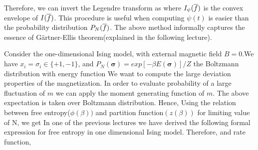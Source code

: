 \documentclass[letterpaper,english,10pt]{article}
\begin{document}
Therefore, we can invert the Legendre transform as 
where $I_\psi(\overline{f})$ is the convex envelope of $I(\overline{f})$. 
This procedure is useful when computing $\psi(t)$ is easier than the probability distribution $P_N(\overline{f})$.
The above method informally captures the essence of G\"{a}rtner-Ellis theorem(explained in the following lecture).
\begin{shaded*}\begin{exmp}
Consider the one-dimensional Ising model, with external magnetic field $B=0$.We have $x_i= \sigma_i \in \{+1,-1\}$, and $P_N(\boldsymbol{\sigma})=exp[-\beta E(\boldsymbol{\sigma} )]/Z$ the Boltzmann distribution with energy function 
We want to compute the large deviation properties of the magnetization.
In order to evaluate probability of a large fluctuation of $m$ we can apply the moment generating function of $m$.
The above expectation is taken over Boltzmann distribution. Hence,
Using the relation between free entropy($\phi(\beta))$ and partition function$(z(\beta))$ for limiting value of N, we get
In one of the previous lectures we have derived the following formal expression for free entropy in one dimensional Ising model.
Therefore,
and rate function,

\end{exmp}\end{shaded*}
\end{document}
